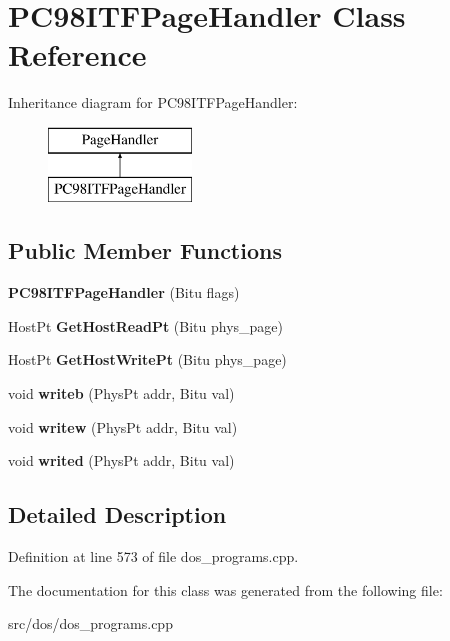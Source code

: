 \hypertarget{classPC98ITFPageHandler}{\section{P\-C98\-I\-T\-F\-Page\-Handler Class Reference}
\label{classPC98ITFPageHandler}
}
Inheritance diagram for P\-C98\-I\-T\-F\-Page\-Handler\-:\begin{figure}[H]
\begin{center}
\leavevmode
\includegraphics[height=2.000000cm]{classPC98ITFPageHandler}
\end{center}
\end{figure}
\subsection*{Public Member Functions}
\begin{DoxyCompactItemize}
\item 
\hypertarget{classPC98ITFPageHandler_a04944f2dfee9ee653ca0bfd4da327d72}{{\bfseries P\-C98\-I\-T\-F\-Page\-Handler} (Bitu flags)}\label{classPC98ITFPageHandler_a04944f2dfee9ee653ca0bfd4da327d72}

\item 
\hypertarget{classPC98ITFPageHandler_abc27a522e5012fb74276d27cc5d11c82}{Host\-Pt {\bfseries Get\-Host\-Read\-Pt} (Bitu phys\-\_\-page)}\label{classPC98ITFPageHandler_abc27a522e5012fb74276d27cc5d11c82}

\item 
\hypertarget{classPC98ITFPageHandler_a06c34515bcd91a529b3154bfc07204e7}{Host\-Pt {\bfseries Get\-Host\-Write\-Pt} (Bitu phys\-\_\-page)}\label{classPC98ITFPageHandler_a06c34515bcd91a529b3154bfc07204e7}

\item 
\hypertarget{classPC98ITFPageHandler_abf787521e70eefa50eccbcf8a35fd0f5}{void {\bfseries writeb} (Phys\-Pt addr, Bitu val)}\label{classPC98ITFPageHandler_abf787521e70eefa50eccbcf8a35fd0f5}

\item 
\hypertarget{classPC98ITFPageHandler_a2edf43a4dffec0041ec8868d7e2c303e}{void {\bfseries writew} (Phys\-Pt addr, Bitu val)}\label{classPC98ITFPageHandler_a2edf43a4dffec0041ec8868d7e2c303e}

\item 
\hypertarget{classPC98ITFPageHandler_af55366e5c138df95ece08b3a61396e54}{void {\bfseries writed} (Phys\-Pt addr, Bitu val)}\label{classPC98ITFPageHandler_af55366e5c138df95ece08b3a61396e54}

\end{DoxyCompactItemize}


\subsection{Detailed Description}


Definition at line 573 of file dos\-\_\-programs.\-cpp.



The documentation for this class was generated from the following file\-:\begin{DoxyCompactItemize}
\item 
src/dos/dos\-\_\-programs.\-cpp\end{DoxyCompactItemize}
